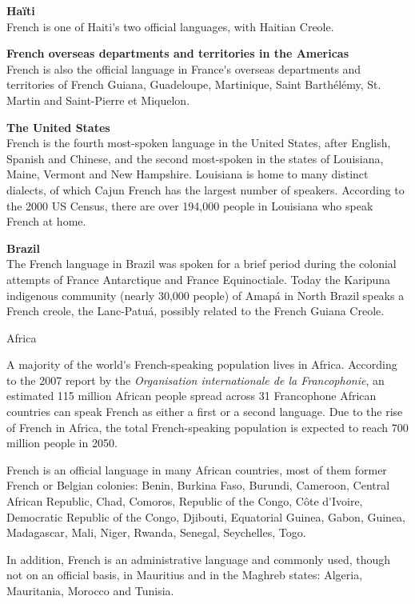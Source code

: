 \documentclass[]{../metanetpaper}
\begin{document}
\begin{multicols}{2}
{\bf Haïti}\\
French is one of Haiti{\mbox '}s two official languages, with Haitian Creole. 

{\bf French overseas departments and territories in the Americas}\\
French is also the official language in France{\mbox '}s overseas departments and territories of French Guiana, Guadeloupe, Martinique, Saint Barthélémy, St. Martin and Saint-Pierre et Miquelon.

{\bf The United States }\\
French is the fourth most-spoken language in the United States, after
English, Spanish and Chinese, and the second most-spoken in the states
of Louisiana, Maine, Vermont and New Hampshire. Louisiana is home to
many distinct dialects, of which Cajun French has the largest number
of speakers. According to the 2000 US Census, there are over 194,000
people in Louisiana who speak French at home.

{\bf Brazil}\\
The French language in Brazil was spoken for a brief period during the
colonial attempts of France Antarctique and France Equinoctiale. Today
the Karipuna indigenous community (nearly 30,000 people) of Amapá in
North Brazil speaks a French creole, the Lanc-Patuá, possibly related
to the French Guiana Creole.

\begin{center}
{\sc Africa}
\end{center}

A majority of the world{\mbox '}s French-speaking population lives in
Africa. According to the 2007 report by the {\em Organisation
internationale de la Francophonie}, an estimated 115 million African
people spread across 31 Francophone African countries can speak French
as either a first or a second language. Due to the rise of French in
Africa, the total French-speaking population is expected to reach 700
million people in 2050.

French is an official language in many African countries, most of them
former French or Belgian colonies: Benin, Burkina Faso, Burundi,
Cameroon, Central African Republic, Chad, Comoros, Republic of the
Congo, Côte d{\mbox '}Ivoire, Democratic Republic of the Congo, Djibouti,
Equatorial Guinea, Gabon, Guinea, Madagascar, Mali, Niger, Rwanda,
Senegal, Seychelles, Togo.

In addition, French is an administrative language and commonly used,
though not on an official basis, in Mauritius and in the Maghreb
states: Algeria, Mauritania, Morocco and Tunisia.


\end{multicols}
\end{document}
